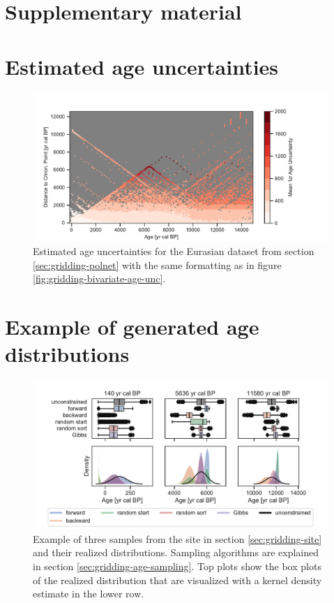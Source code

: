 \documentclass[
11pt, %
english, %
singlespacing, %
headsepline, %
]{MastersDoctoralThesis} %
\begin{document}
\begin{NoHyper}
\begin{refsection}
\clearpage

\begin{subappendices}
	\section*{Supplementary material}

	\section{Estimated age uncertainties}  \label{sec:gridding-suppl-age-uncertainties}	
		\begin{figure}[!h]
			\includegraphics[width=\linewidth]{gridding-figures/realized-age-uncertainties.pdf}
			\caption[Estimated age uncertainties]{Estimated age uncertainties for the Eurasian dataset from section \ref{sec:gridding-polnet} with the same formatting as in figure \ref{fig:gridding-bivariate-age-unc}.}
			\label{fig:gridding-age-uncertainties}
		\end{figure}

	\section{Example of generated age distributions} \label{sec:gridding-suppl-age-example-distributions}
		\begin{figure}[!h]
			\includegraphics[width=\linewidth]{gridding-figures/age-sampling-methods-use-case.pdf}
			\caption[Example of sampled distribution]{Example of three samples from the site in section \ref{sec:gridding-site} and their realized distributions. Sampling algorithms are explained in section \ref{sec:gridding-age-sampling}. Top plots show the box plots of the realized distribution that are visualized with a kernel density estimate in the lower row.}
			\label{fig:gridding-age-example-distributions}
		\end{figure}


\end{subappendices}
\end{refsection}
\end{NoHyper}
\end{document}
